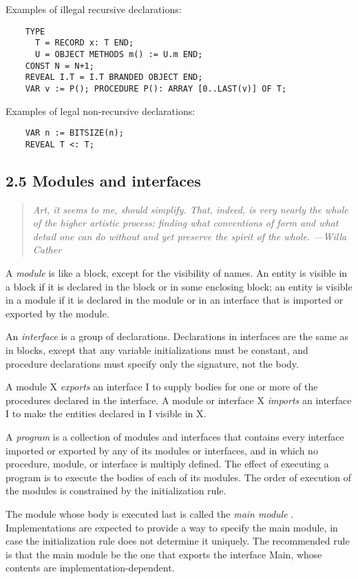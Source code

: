 \documentclass[10pt]{article}
\begin{document}
Examples of illegal recursive declarations:
\begin{verbatim}
    TYPE
      T = RECORD x: T END;
      U = OBJECT METHODS m() := U.m END;
    CONST N = N+1;
    REVEAL I.T = I.T BRANDED OBJECT END;
    VAR v := P(); PROCEDURE P(): ARRAY [0..LAST(v)] OF T;
\end{verbatim}

Examples of legal non-recursive declarations:
\begin{verbatim}
    VAR n := BITSIZE(n);
    REVEAL T <: T;
\end{verbatim}

\subsection*{2.5 Modules and interfaces}

\begin{quote}
  \emph{ Art, it seems to me, should simplify.  That, indeed, is very nearly
    the whole of the higher artistic process; finding what conventions of form
    and what detail one can do without and yet preserve the spirit of the
    whole.  ---Willa Cather }
\end{quote}

A \emph{module} is like a block, except for the visibility of names.  An entity
is visible in a block if it is declared in the block or in some enclosing
block; an entity is visible in a module if it is declared in the module or in
an interface that is imported or exported by the module.

An \emph{interface} is a group of declarations.  Declarations in interfaces are
the same as in blocks, except that any variable initializations must be
constant, and procedure declarations must specify only the signature, not the
body.

A module X \emph{exports} an interface I to supply bodies for one or more of
the procedures declared in the interface.  A module or interface X
\emph{imports} an interface I to make the entities declared in I visible in X.

A \emph{program} is a collection of modules and interfaces that contains every
interface imported or exported by any of its modules or interfaces, and in
which no procedure, module, or interface is multiply defined.  The effect of
executing a program is to execute the bodies of each of its modules.  The order
of execution of the modules is constrained by the initialization rule.

The module whose body is executed last is called the \emph{main module}
.  Implementations are expected to provide a way to specify the main module, in
case the initialization rule does not determine it uniquely.  The recommended
rule is that the main module be the one that exports the interface Main, whose
contents are implementation-dependent.
\end{document}

